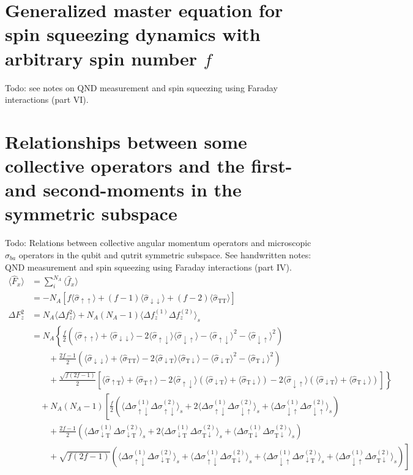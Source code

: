 \documentclass[preprint,aps,pra,onecolumn,superscriptaddress]{revtex4-1} %
\newcommand{\nn}{\nonumber}
\newcommand{\expect}[1]{\big\langle #1 \big\rangle}
\newcommand{\sigmauu}{\hat{\sigma}_{\uparrow\uparrow}}
\newcommand{\sigmaud}{\hat{\sigma}_{\uparrow\downarrow}}
\newcommand{\sigmaut}{\hat{\sigma}_{\uparrow \mathrm{T}}}
\newcommand{\sigmadu}{\hat{\sigma}_{\downarrow\uparrow}}
\newcommand{\sigmadd}{\hat{\sigma}_{\downarrow\downarrow}}
\newcommand{\sigmadt}{\hat{\sigma}_{\downarrow \mathrm{T}}}
\newcommand{\sigmatu}{\hat{\sigma}_{\mathrm{T}\uparrow}}
\newcommand{\sigmatd}{\hat{\sigma}_{\mathrm{T}\downarrow}}
\newcommand{\sigmatt}{\hat{\sigma}_{\mathrm{T}\mathrm{T}}}
\newcommand{\Dsigmaud}{\Delta\sigma_{\uparrow\downarrow}}
\newcommand{\Dsigmadu}{\Delta\sigma_{\downarrow\uparrow}}
\newcommand{\Dsigmadt}{\Delta\sigma_{\downarrow \mathrm{T}}}
\newcommand{\Dsigmatd}{\Delta\sigma_{\mathrm{T}\downarrow}}
\newcommand{\comment}[1]{{\color{Maroon} #1}}
\begin{document}
\begin{appendix}
\section{Generalized master equation for spin squeezing dynamics with arbitrary spin number $f$} \label{Appendix::OpticalPumpingForGeneralF}
\comment{Todo: see notes on QND measurement and spin squeezing using Faraday interactions (part VI).}


\section{Relationships between some collective operators and the first- and second-moments in the symmetric subspace} \label{Appendix::collectivespinoperators}

\comment{Todo: Relations between collective angular momentum operators and microscopic $\sigma_{ba}$ operators in the qubit and qutrit symmetric subspace. See handwritten notes: QND measurement and spin squeezing using Faraday interactions (part IV).}
\begin{subequations}
	\begin{align}
	\expect{\hat{F}_x} &= \sum_i^{N_A}\expect{\hat{f}_x}\nonumber\\
	&= -N_A \left[f\expect{\sigmauu}+(f-1)\expect{\sigmadd}+(f-2)\expect{\sigmatt } \right]\\
	\Delta F_z^2 &= N_A\expect{\Delta f_z^2} + N_A(N_A-1)\expect{\Delta f_z^{(1)}\Delta f_z^{(2)} }_s\nn\\
	&=N_A\left\{ \frac{f}{2}\left(\expect{\sigmauu}+\expect{\sigmadd}-2\expect{\sigmaud}\expect{\sigmadu}-\expect{\sigmaud}^2-\expect{\sigmadu}^2 \right)\right. \nn\\
	&\quad\quad+ \frac{2f-1}{2}\left(\expect{\sigmadd}+\expect{\sigmatt}-2\expect{\sigmadt}\expect{\sigmatd}-\expect{\sigmadt}^2-\expect{\sigmatd}^2 \right)\nn\\
	&\quad\quad +\left. \frac{\sqrt{f(2f-1)}}{2}\left[\expect{\sigmaut }+\expect{\sigmatu} -2\expect{\sigmaud}(\expect{\sigmadt}+\expect{\sigmatd}) -2\expect{\sigmadu}(\expect{\sigmadt}+\expect{\sigmatd} ) \right] \right\}\nn\\
	&\quad +N_A(N_A-1)\left[\frac{f}{2}(\expect{\Dsigmaud^{(1)}\Dsigmaud^{(2)} }_s +2\expect{\Dsigmaud^{(1)}\Dsigmadu^{(2)} }_s+\expect{\Dsigmadu^{(1)}\Dsigmadu^{(2)} }_s )\right.\\
	&\quad\quad + \frac{2f-1}{2}(\expect{\Dsigmadt^{(1)}\Dsigmadt^{(2)} }_s +2\expect{\Dsigmadt^{(1)}\Dsigmatd^{(2)} }_s +\expect{\Dsigmatd^{(1)}\Dsigmatd^{(2)} }_s) \nn\\
	&\quad\quad + \left. \sqrt{f(2f-1)}(\expect{\Dsigmaud^{(1)}\Dsigmadt^{(2)} }_s +\expect{\Dsigmaud^{(1)}\Dsigmatd^{(2)} }_s +\expect{\Dsigmadu^{(1)}\Dsigmadt^{(2)} }_s+\expect{\Dsigmadu^{(1)}\Dsigmatd^{(2)} }_s )\right]\nn
	\end{align}
\end{subequations}



\end{appendix}
\end{document}
